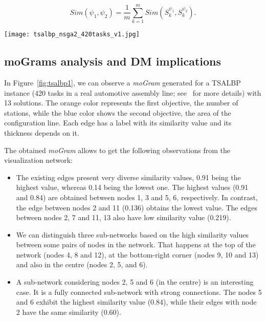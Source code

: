 \documentclass[journal]{IEEEtran}
\begin{document}
\begin{equation} \label{eq:sim-T}
 Sim(\psi_1,\psi_2) = \frac{1}{m} \sum_{k=1}^m Sim(S_k^{\psi_1},S_k^{\psi_2}).
\end{equation}
 
\begin{figure*}[ht]
 \centering
\texttt{[image: tsalbp\_nsga2\_420tasks\_v1.jpg]}
\caption{\emph{moGram} generated for an instance of the TSALBP problem.}
\label{fig:tsalbp1}
\end{figure*}

\subsection{moGrams analysis and DM implications}


In Figure~\ref{fig:tsalbp1}, we can observe a \emph{moGram} generated for a TSALBP instance (420 tasks in a real automotive assembly line; see~\cite{Chica16OMEGA} for more details) with 13 solutions. The orange color represents the first objective, the number of stations, while the blue color shows the second objective, the area of the configuration line. Each edge has a label with its similarity value and its thickness depends on it.


The obtained \emph{moGram} allows to get the following observations from the visualization network:
\begin{itemize}
\item The existing edges present very diverse similarity values, 0.91 being the highest value, whereas 0.14 being the lowest one. The highest values (0.91 and 0.84) are obtained between nodes 1, 3 and 5, 6, respectively. In contrast, the edge between nodes 2 and 11 (0.136) obtains the lowest value. The edges between nodes 2, 7 and 11, 13 also have low similarity value (0.219).
 \item We can distinguish three sub-networks based on the high similarity values between some pairs of nodes in the network. That happens at the top of the network (nodes 4, 8 and 12), at the bottom-right corner (nodes 9, 10 and 13) and also in the centre (nodes 2, 5, and 6). 
 \item A sub-network considering nodes 2, 5 and 6 (in the centre) is an interesting case. It is a fully connected sub-network with strong connections. The nodes 5 and 6 exhibit the highest similarity value (0.84), while their edges with node 2 have the same similarity (0.60).
\end{itemize}
\end{document}
